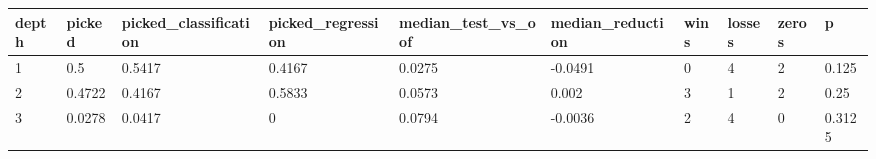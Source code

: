 \begin{tabular}{llllllllll}
\toprule
depth & picked & picked\_classification & picked\_regression & median\_test\_vs\_oof & median\_reduction & wins & losses & zeros & p \\
\midrule
1 & 0.5 & 0.5417 & 0.4167 & 0.0275 & -0.0491 & 0 & 4 & 2 & 0.125 \\
2 & 0.4722 & 0.4167 & 0.5833 & 0.0573 & 0.002 & 3 & 1 & 2 & 0.25 \\
3 & 0.0278 & 0.0417 & 0 & 0.0794 & -0.0036 & 2 & 4 & 0 & 0.3125 \\
\bottomrule
\end{tabular}
